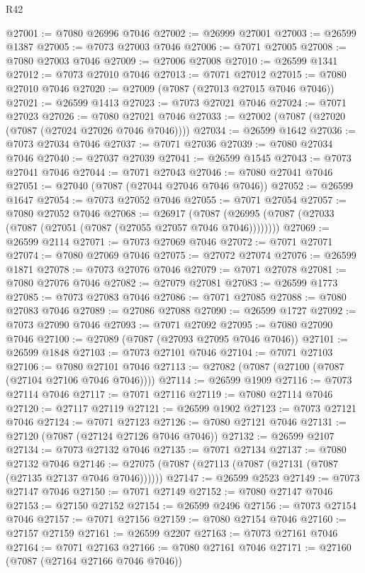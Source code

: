 \begin{lexlean}{R42}
\begin{coremodule}
{@27001 := @7080 @26996 @7046
@27002 := @26999 @27001
@27003 := @26599 @1387
@27005 := @7073 @27003 @7046
@27006 := @7071 @27005
@27008 := @7080 @27003 @7046
@27009 := @27006 @27008
@27010 := @26599 @1341
@27012 := @7073 @27010 @7046
@27013 := @7071 @27012
@27015 := @7080 @27010 @7046
@27020 := @27009 (@7087 (@27013 @27015 @7046 @7046))
@27021 := @26599 @1413
@27023 := @7073 @27021 @7046
@27024 := @7071 @27023
@27026 := @7080 @27021 @7046
@27033 := @27002 (@7087 (@27020 (@7087 (@27024 @27026 @7046 @7046))))
@27034 := @26599 @1642
@27036 := @7073 @27034 @7046
@27037 := @7071 @27036
@27039 := @7080 @27034 @7046
@27040 := @27037 @27039
@27041 := @26599 @1545
@27043 := @7073 @27041 @7046
@27044 := @7071 @27043
@27046 := @7080 @27041 @7046
@27051 := @27040 (@7087 (@27044 @27046 @7046 @7046))
@27052 := @26599 @1647
@27054 := @7073 @27052 @7046
@27055 := @7071 @27054
@27057 := @7080 @27052 @7046
@27068 := @26917
    (@7087 (@26995 (@7087 (@27033 (@7087 (@27051 (@7087 (@27055 @27057 @7046 @7046))))))))
@27069 := @26599 @2114
@27071 := @7073 @27069 @7046
@27072 := @7071 @27071
@27074 := @7080 @27069 @7046
@27075 := @27072 @27074
@27076 := @26599 @1871
@27078 := @7073 @27076 @7046
@27079 := @7071 @27078
@27081 := @7080 @27076 @7046
@27082 := @27079 @27081
@27083 := @26599 @1773
@27085 := @7073 @27083 @7046
@27086 := @7071 @27085
@27088 := @7080 @27083 @7046
@27089 := @27086 @27088
@27090 := @26599 @1727
@27092 := @7073 @27090 @7046
@27093 := @7071 @27092
@27095 := @7080 @27090 @7046
@27100 := @27089 (@7087 (@27093 @27095 @7046 @7046))
@27101 := @26599 @1848
@27103 := @7073 @27101 @7046
@27104 := @7071 @27103
@27106 := @7080 @27101 @7046
@27113 := @27082 (@7087 (@27100 (@7087 (@27104 @27106 @7046 @7046))))
@27114 := @26599 @1909
@27116 := @7073 @27114 @7046
@27117 := @7071 @27116
@27119 := @7080 @27114 @7046
@27120 := @27117 @27119
@27121 := @26599 @1902
@27123 := @7073 @27121 @7046
@27124 := @7071 @27123
@27126 := @7080 @27121 @7046
@27131 := @27120 (@7087 (@27124 @27126 @7046 @7046))
@27132 := @26599 @2107
@27134 := @7073 @27132 @7046
@27135 := @7071 @27134
@27137 := @7080 @27132 @7046
@27146 := @27075 (@7087 (@27113 (@7087 (@27131 (@7087 (@27135 @27137 @7046 @7046))))))
@27147 := @26599 @2523
@27149 := @7073 @27147 @7046
@27150 := @7071 @27149
@27152 := @7080 @27147 @7046
@27153 := @27150 @27152
@27154 := @26599 @2496
@27156 := @7073 @27154 @7046
@27157 := @7071 @27156
@27159 := @7080 @27154 @7046
@27160 := @27157 @27159
@27161 := @26599 @2207
@27163 := @7073 @27161 @7046
@27164 := @7071 @27163
@27166 := @7080 @27161 @7046
@27171 := @27160 (@7087 (@27164 @27166 @7046 @7046))
}
\end{coremodule}
\end{lexlean}
